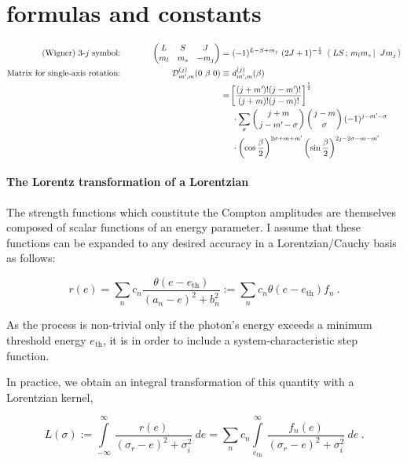 \documentclass[onecolumn,preprint,superscriptaddress,nofootinbib,notitlepage,10pt,linenumbers]{revtex4-1}
\newcommand*{\mprime}{^{\prime}\mkern-1.2mu}
\newcommand*{\ethr}{e_\text{th}}
\newcommand{\be}{\begin{equation}}
\newcommand{\ee}{\end{equation}}
\newcommand{\la}{\label}
\newcommand{\threej}[6]{\ensuremath{\begin{pmatrix}#1 & #2 & #3\\#4&#5&#6 \end{pmatrix}}}
\newcommand{\clg}[6]{\ensuremath{\left\langle\left.\,#1#2\,;\,#3#4\,\right\vert\right.\left.\,#5#6\,\right\rangle}}
\begin{document}
\newpage

\section{formulas and constants}

\begin{alignat}{2}
\text{(Wigner) 3-$j$ symbol:} &\hspace{1cm}& \threej{L}{S}{J}{m_l}{m_s}{-m_j}=&~(-1)^{L-S+m_j}~(2J+1)^{-\frac{1}{2}}~\clg{L}{S}{m_l}{m_s}{J}{m_j}\\
\text{Matrix for single-axis rotation:} &\hspace{1cm}&   \mathcal{D}_{m\mprime,m}^{(j)}(0~\beta~0)\equiv&~d_{m\mprime,m}^{(j)}(\beta)\nonumber\\
&\hspace{1cm}& =&\left[\frac{(j+m\mprime)!(j-m\mprime)!}{(j+m)!(j-m)!}\right]^\frac{1}{2}\nonumber\\
&\hspace{1cm}&&~\cdot\sum_\sigma\left(j+m\atop j-m\mprime-\sigma\right)\left(j-m\atop \sigma\right)(-1)^{j-m\mprime-\sigma}\nonumber\\
&\hspace{1cm}&&~\cdot\left(\cos\frac{\beta}{2}\right)^{2\sigma+m+m\mprime}\left(\sin\frac{\beta}{2}\right)^{2j-2\sigma-m-m\mprime}\\
\end{alignat}

\paragraph{The Lorentz transformation of a Lorentzian\\}\la{sec.LoOfLo}

The strength functions which constitute
the Compton amplitudes are themselves composed of scalar functions of an energy parameter.
I assume that these functions can be expanded to any desired accuracy in a Lorentzian/Cauchy
basis as follows:

\be\la{eq.responseexp}
r(e)=\sum_nc_n\frac{\theta(e-\ethr)}{(a_n-e)^2+b_n^2}:=\sum_nc_n\theta(e-\ethr)f_n~.
\ee

As the process is non-trivial only if the photon's energy exceeds a minimum threshold
energy $\ethr$, it is in order to include a system-characteristic step function.

In practice, we obtain an integral transformation of this quantity with a Lorentzian kernel,

\be
L(\sigma):=\int\limits^\infty_{-\infty}\,\frac{r(e)}{(\sigma_r-e)^2+\sigma_i^2}~de
=\sum_nc_n\int\limits^\infty_{e_\text{th}}\,\frac{f_n(e)}{(\sigma_r-e)^2+\sigma_i^2}~de~.
\ee
\end{document}
